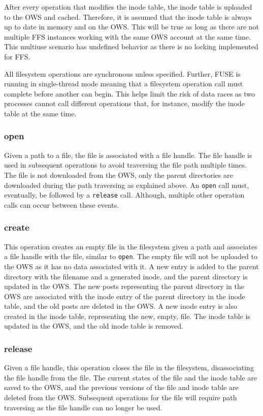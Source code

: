 After every operation that modifies the inode table, the inode table is uploaded to the \gls{OWS} and cached. Therefore, it is assumed that the inode table is always up to date in memory and on the \gls{OWS}. This will be true as long as there are not multiple \gls{FFS} instances working with the same \gls{OWS} account at the same time. This multiuse scenario has undefined behavior as there is no locking implemented for \gls{FFS}.

All filesystem operations are synchronous unless specified. Further, \gls{FUSE} is running in \mbox{single-thread} mode meaning that a filesystem operation call must complete before another can begin. This helps limit the risk of data races as two processes cannot call different operations that, for instance, modify the inode table at the same time.

\subsubsection{open}
Given a path to a file, the file is associated with a file handle. The file handle is used in subsequent operations to avoid traversing the file path multiple times. The file is not downloaded from the \gls{OWS}, only the parent directories are downloaded during the path traversing as explained above. An \texttt{open} call must, eventually, be followed by a \texttt{release} call. Although, multiple other operation calls can occur between these events.

\subsubsection{create}
This operation creates an empty file in the filesystem given a path and associates a file handle with the file, similar to \texttt{open}. The empty file will not be uploaded to the \gls{OWS} as it has no data associated with it. A new entry is added to the parent directory with the filename and a generated inode, and the parent directory is updated in the \gls{OWS}. The new posts representing the parent directory in the \gls{OWS} are associated with the inode entry of the parent directory in the inode table, and the old posts are deleted in the \gls{OWS}. A new inode entry is also created in the inode table, representing the new, empty, file. The inode table is updated in the \gls{OWS}, and the old inode table is removed.

\subsubsection{release}
Given a file handle, this operation closes the file in the filesystem, disassociating the file handle from the file. The current states of the file and the inode table are saved to the \gls{OWS}, and the previous versions of the file and inode table are deleted from the \gls{OWS}. Subsequent operations for the file will require path traversing as the file handle can no longer be used.


